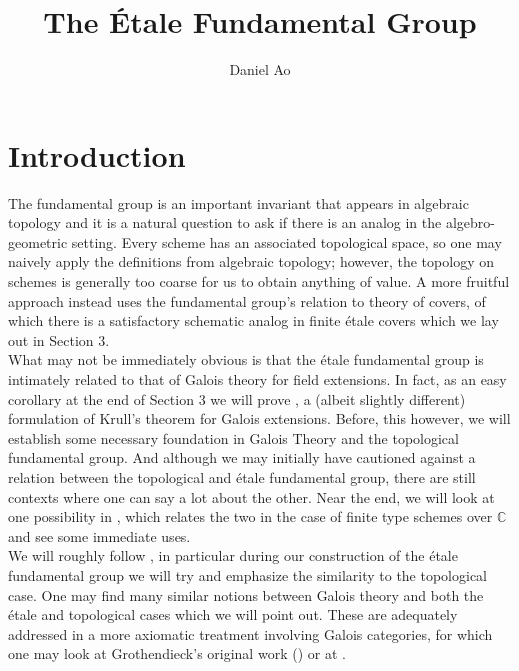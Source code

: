\documentclass{article}
\theoremstyle{definition}
\theoremstyle{remark}
\theoremstyle{plain}
\newcommand{\C}{\mathbb{C}}
\begin{document}
\title{The \'Etale Fundamental Group}
\author{Daniel Ao}

\maketitle

\tableofcontents

\section{Introduction}

The fundamental group is an important invariant that appears in algebraic topology and it is a natural question to ask if there is an analog in the algebro-geometric setting.
Every scheme has an associated topological space, so one may naively apply the definitions from algebraic topology; however, the topology on schemes is generally too coarse for us to obtain anything of value.
A more fruitful approach instead uses the fundamental group's relation to theory of covers, of which there is a satisfactory schematic analog in finite \'etale covers which we lay out in Section 3.\\

What may not be immediately obvious is that the \'etale fundamental group is intimately related to that of Galois theory for field extensions. 
In fact, as an easy corollary at the end of Section 3 we will prove , a (albeit slightly different) formulation of Krull's theorem for Galois extensions.
Before, this however, we will establish some necessary foundation in Galois Theory and the topological fundamental group. 
And although we may initially have cautioned against a relation between the topological and \'etale fundamental group, there are still contexts where one can say a lot about the other.
Near the end, we will look at one possibility in , which relates the two in the case of finite type schemes over $\C$ and see some immediate uses.\\

\indent We will roughly follow \cite{Szamuely}, in particular during our construction of the \'etale fundamental group we will try and emphasize the similarity to the topological case.
One may find many similar notions between Galois theory and both the \'etale and topological cases which we will point out.
These are adequately addressed in a more axiomatic treatment involving Galois categories, for which one may look at Grothendieck's original work (\cite{grothendieck}) or at \cite{Lenstra}.
\end{document}
